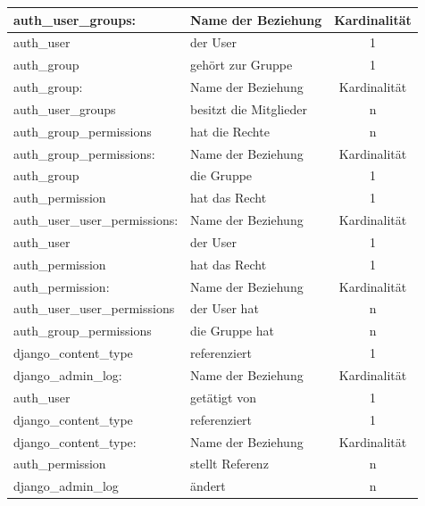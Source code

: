 \begin{longtable}{|p{5cm}||m{5cm}|c|}
  auth\_user\_groups:  & Name der Beziehung &  Kardinalit\"at\\
  \hline\hline
  auth\_user & der User & 1 \\
  \hline
  auth\_group & gehört zur Gruppe & 1 \\
  \hline\hline\hline
  
  auth\_group: & Name der Beziehung &  Kardinalit\"at\\
  \hline\hline
  auth\_user\_groups & besitzt die Mitglieder & n \\
  \hline
  auth\_group\_permissions & hat die Rechte & n \\
  \hline\hline\hline 

  auth\_group\_permissions: & Name der Beziehung &  Kardinalit\"at\\
  \hline\hline
  auth\_group & die Gruppe & 1 \\
  \hline
  auth\_permission & hat das Recht & 1 \\
  \hline
  \pagebreak
  \hline\hline 
  
  auth\_user\_user\_permissions:  & Name der Beziehung &  Kardinalit\"at\\
  \hline\hline
  auth\_user & der User & 1 \\
  \hline
  auth\_permission & hat das Recht & 1 \\
  \hline\hline\hline 
  
  auth\_permission:  & Name der Beziehung &  Kardinalit\"at\\
  \hline\hline
  auth\_user\_user\_permissions & der User hat  & n \\
  \hline
  auth\_group\_permissions & die Gruppe hat & n \\
  \hline
  django\_content\_type & referenziert & 1 \\
  \hline\hline\hline
  
  django\_admin\_log:  & Name der Beziehung &  Kardinalit\"at\\
  \hline\hline
  auth\_user & getätigt von  & 1 \\
  \hline
  django\_content\_type & referenziert & 1 \\
  \hline\hline\hline
  
  django\_content\_type:  & Name der Beziehung &  Kardinalit\"at\\
  \hline\hline
  auth\_permission & stellt Referenz  & n \\
  \hline
  django\_admin\_log & ändert & n \\
  \hline
\end{longtable}
